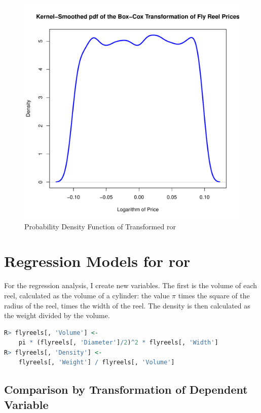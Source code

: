 \documentclass[11pt]{paper}
\begin{document}
\begin{figure}[h!]
  \centering
  \includegraphics[scale = 0.5, keepaspectratio=true]{../Figures/density_trans_ror}
  \caption{Probability Density Function of Transformed ror} \label{fig:density_trans_ror}
\end{figure}


\pagebreak
\section{Regression Models for ror}


For the regression analysis, I create new variables.
The first is the volume of each reel, 
calculated as the volume of a cylinder: 
the value $\pi$ times the square of the radius of the reel,
times the width of the reel. 
The density is then calculated as the weight 
divided by the volume. 

\begin{lstlisting}[language=R]
R> flyreels[, 'Volume'] <- 
	pi * (flyreels[, 'Diameter']/2)^2 * flyreels[, 'Width']
R> flyreels[, 'Density'] <- 
	flyreels[, 'Weight'] / flyreels[, 'Volume']
\end{lstlisting}



\subsection{Comparison by Transformation of Dependent Variable}
\end{document}
